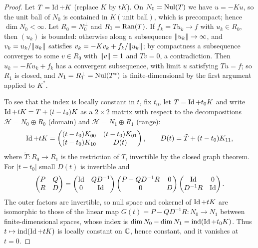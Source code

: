 \begin{proof}
Let $T=\operatorname{Id}+K$ (replace $K$ by $tK$). On $N_0=\operatorname{Nul}(T)$ we have $u=-Ku$, so the
unit ball of $N_0$ is contained in $K(\text{unit ball})$, which is precompact;
hence $\dim N_0<\infty$. Let $R_0=N_0^\perp$ and $R_1=\operatorname{Ran}(T)$. If
$f_k=Tu_k\to f$ with $u_k\in R_0$, then $(u_k)$ is bounded: otherwise along a
subsequence $\lVert u_k\rVert\to\infty$, and $v_k=u_k/\lVert u_k\rVert$ satisfies
$v_k=-Kv_k+f_k/\lVert u_k\rVert$; by compactness a subsequence converges to some
$v\in R_0$ with $\lVert v\rVert=1$ and $Tv=0$, a contradiction. Then
$u_k=-Ku_k+f_k$ has a convergent subsequence, with limit $u$ satisfying
$Tu=f$; so $R_1$ is closed, and $N_1=R_1^\perp=\operatorname{Nul}(T^*)$ is finite-dimensional
by the first argument applied to $K^*$.

To see that the index is locally constant in $t$, fix $t_0$, let $T=\operatorname{Id}+t_0K$
and write $\operatorname{Id}+tK=T+(t-t_0)K$ as a $2\times2$ matrix with respect to the
decompositions $\mathcal H=N_0\oplus R_0$ (domain) and $\mathcal H=N_1\oplus R_1$
(range):
\begin{equation*}
  \operatorname{Id}+tK=\begin{pmatrix}(t-t_0)K_{00}&(t-t_0)K_{01}\\(t-t_0)K_{10}&D(t)\end{pmatrix},
  \qquad D(t)=\tilde T+(t-t_0)K_{11},
\end{equation*}
where $\tilde T:R_0\to R_1$ is the restriction of $T$, invertible by the closed
graph theorem. For $|t-t_0|$ small $D(t)$ is invertible and
\begin{equation*}
  \begin{pmatrix}P&Q\\R&D\end{pmatrix}=\begin{pmatrix}\operatorname{Id}&QD^{-1}\\0&\operatorname{Id}\end{pmatrix}
  \begin{pmatrix}P-QD^{-1}R&0\\0&D\end{pmatrix}\begin{pmatrix}\operatorname{Id}&0\\D^{-1}R&\operatorname{Id}\end{pmatrix}.
\end{equation*}
The outer factors are invertible, so null space and cokernel of $\operatorname{Id}+tK$ are
isomorphic to those of the linear map $G(t)=P-QD^{-1}R:N_0\to N_1$ between
finite-dimensional spaces, whose index is $\dim N_0-\dim N_1=\operatorname{ind}(\operatorname{Id}+t_0K)$.
Thus $t\mapsto\operatorname{ind}(\operatorname{Id}+tK)$ is locally constant on $\mathbb{C}$, hence constant, and it
vanishes at $t=0$.
\end{proof}

